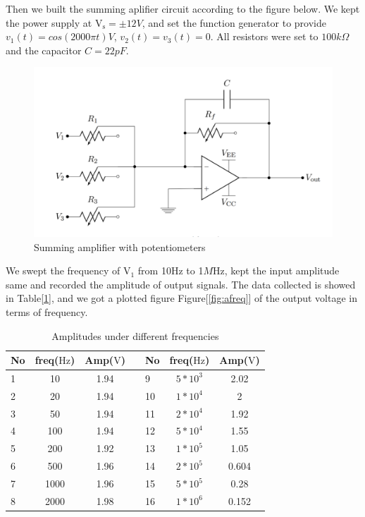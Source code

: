 \hfill \newline
\phantom{ } Then we built the summing aplifier circuit according to the figure below. We kept the power supply at $ \mathrm{V_s} = \pm12\si{V} $, and set the function generator to provide ${v_1}(t)=cos(2000\pi t)\si{V}$, ${v_2}(t)={v_3}(t)=0$. All resistors were set to $100\si{k\Omega}$ and the capacitor $C=22\si{pF}$.
\begin{figure}[!htbp]
	\centering 
	\begin{framed}
		\includegraphics[width=\linewidth]{images/summing_amp.PNG} 
		\caption{Summing amplifier with potentiometers}
		\label{fig:samp} 
	\end{framed}
\end{figure} 

\phantom{ } We swept the frequency of $\mathrm{V_1}$ from 10$\si{\hertz}$ to 1$\si{M\hertz}$, kept the input amplitude same and recorded the amplitude of output signals. The data collected is showed in Table[\ref{tab:caf}], and we got a plotted figure Figure[\ref{fig:afreq}] of the output voltage in terms of frequency.\\

\begin{table}[!htbp]
	\centering
	\caption{Amplitudes under different frequencies}
	\begin{tabular}{lccllcc}
		\toprule
		No&freq($\si{\hertz}$)&Amp($\si{\volt}$)&&No&freq($\si{\hertz}$)  &Amp($\si{\volt}$)\\
		\midrule
		1	&10		&1.94	&&9 &$5*10^3$&2.02\\
		2	&20		&1.94	&&10&$1*10^4$&2\\
		3	&50		&1.94	&&11&$2*10^4$&1.92\\
		4	&100	&1.94	&&12&$5*10^4$&1.55\\
		5	&200	&1.92	&&13&$1*10^5$&1.05\\
		6	&500	&1.96	&&14&$2*10^5$&0.604\\
		7	&1000	&1.96	&&15&$5*10^5$&0.28\\
		8	&2000	&1.98	&&16&$1*10^6$&0.152\\
		\bottomrule
	\end{tabular}
	\label{tab:caf}
\end{table}

